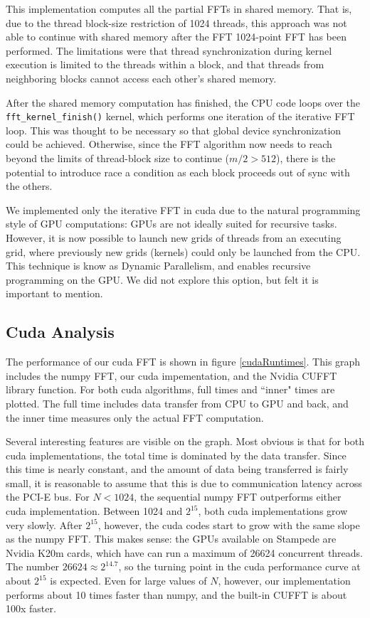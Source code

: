 This implementation computes all the partial FFTs in shared memory. That is, due to the thread block-size restriction of 1024 threads, this approach was not able to continue with shared memory after the FFT 1024-point FFT has been performed. The limitations were that thread synchronization during kernel execution is limited to the threads within a block, and that threads from neighboring blocks cannot access each other's shared memory.

After the shared memory computation has finished, the CPU code loops over the \texttt{fft\_kernel\_finish()} kernel, which performs one iteration of the iterative FFT loop. This was thought to be necessary so that global device synchronization could be achieved. Otherwise, since the FFT algorithm now needs to reach beyond the limits of thread-block size to continue ($m/2 > 512$), there is the potential to introduce race a condition as each block proceeds out of sync with the others. 

We implemented only the iterative FFT in cuda due to the natural programming style of GPU computations: GPUs are not ideally suited for recursive tasks. However, it is now possible to launch new grids of threads from an executing grid, where previously new grids (kernels) could only be launched from the CPU. This technique is know as Dynamic Parallelism, and enables recursive programming on the GPU. We did not explore this option, but felt it is important to mention.

\subsection{Cuda Analysis}
The performance of our cuda FFT is shown in figure \ref{cudaRuntimes}. This graph includes the numpy FFT, our cuda impementation, and the Nvidia CUFFT library function. For both cuda algorithms, full times and ``inner" times are plotted. The full time includes data transfer from CPU to GPU and back, and the inner time measures only the actual FFT computation.

Several interesting features are visible on the graph. Most obvious is that for both cuda implementations, the total time is dominated by the data transfer. Since this time is nearly constant, and the amount of data being transferred is fairly small, it is reasonable to assume that this is due to communication latency across the PCI-E bus. For $N<1024$, the sequential numpy FFT outperforms either cuda implementation. Between 1024 and $2^{15}$, both cuda implementations grow very slowly. After $2^{15}$, however, the cuda codes start to grow with the same slope as the numpy FFT. This makes sense: the GPUs available on Stampede are Nvidia K20m cards, which have can run a maximum of 26624 concurrent threads. The number $26624 \approx 2^{14.7}$, so the turning point in the cuda performance curve at about $2^{15}$ is expected. Even for large values of $N$, however, our implementation performs about 10 times faster than numpy, and the built-in CUFFT is about 100x faster.

